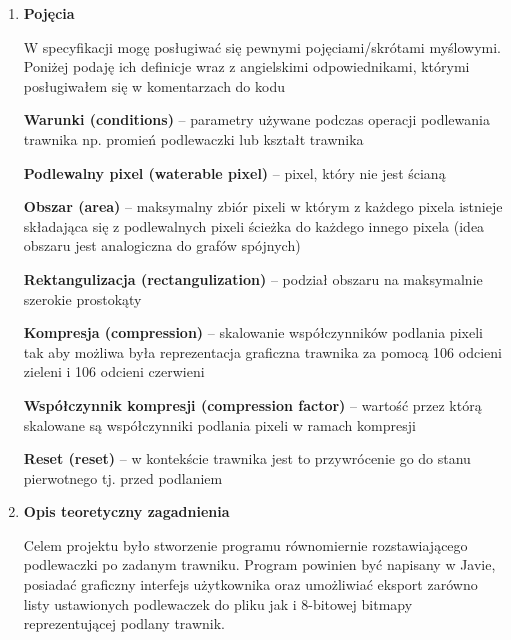 \documentclass[12pt]{article}
\renewcommand{\_}{\kern-1.5pt\textunderscore\kern-1.5pt}
\begin{document}
\vspace{\baselineskip}
\begin{enumerate}
	\item \textbf{Pojęcia}\par

W specyfikacji mogę posługiwać się pewnymi pojęciami/skrótami myślowymi. Poniżej podaję ich definicje wraz z angielskimi odpowiednikami, którymi posługiwałem się w komentarzach do kodu\par

\textbf{Warunki (conditions)} – parametry używane podczas operacji podlewania trawnika np. promień podlewaczki lub kształt trawnika\par

\textbf{Podlewalny pixel (waterable pixel)} – pixel, który nie jest ścianą\par

\textbf{Obszar (area)} – maksymalny zbiór pixeli w którym z każdego pixela istnieje składająca się z podlewalnych pixeli ścieżka do każdego innego pixela (idea obszaru jest analogiczna do grafów spójnych)\par

\textbf{Rektangulizacja (rectangulization)} – podział obszaru na maksymalnie szerokie prostokąty \par

\textbf{Kompresja (compression) }– skalowanie współczynników podlania pixeli tak aby możliwa była reprezentacja graficzna trawnika za pomocą 106 odcieni zieleni i 106 odcieni czerwieni\par

\textbf{Współczynnik kompresji (compression factor) }– wartość przez którą skalowane są współczynniki podlania pixeli w ramach kompresji\par

\textbf{Reset (reset) }– w kontekście trawnika jest to przywrócenie go do stanu pierwotnego tj. przed podlaniem\par


\vspace{\baselineskip}

\vspace{\baselineskip}

\vspace{\baselineskip}
	\item \textbf{Opis teoretyczny zagadnienia}\par

Celem projektu było stworzenie programu równomiernie rozstawiającego podlewaczki po zadanym trawniku. Program powinien być napisany w Javie, posiadać graficzny interfejs użytkownika oraz umożliwiać eksport zarówno listy ustawionych podlewaczek do pliku jak i 8-bitowej bitmapy reprezentującej podlany trawnik.\par


\end{enumerate}
\end{document}
